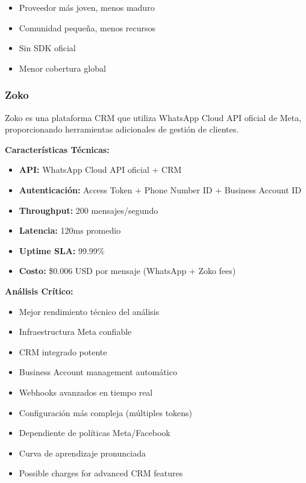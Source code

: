 \documentclass{article}
\begin{document}
\begin{itemize}[label=\textcolor{errorred}{$\times$}]
    \item Proveedor más joven, menos maduro
    \item Comunidad pequeña, menos recursos
    \item Sin SDK oficial
    \item Menor cobertura global
\end{itemize}

\subsubsection{Zoko}
\textnormal{Zoko es una plataforma CRM que utiliza WhatsApp Cloud API oficial de Meta, proporcionando herramientas adicionales de gestión de clientes.}

\textbf{Características Técnicas:}
\begin{itemize}
    \item \textbf{API:} WhatsApp Cloud API oficial + CRM
    \item \textbf{Autenticación:} Access Token + Phone Number ID + Business Account ID
    \item \textbf{Throughput:} 200 mensajes/segundo
    \item \textbf{Latencia:} 120ms promedio  
    \item \textbf{Uptime SLA:} 99.99\%
    \item \textbf{Costo:} \$0.006 USD por mensaje (WhatsApp + Zoko fees)
\end{itemize}

\textbf{Análisis Crítico:}
\begin{itemize}[label=\textcolor{successgreen}{$\checkmark$}]
    \item Mejor rendimiento técnico del análisis
    \item Infraestructura Meta confiable
    \item CRM integrado potente
    \item Business Account management automático
    \item Webhooks avanzados en tiempo real
\end{itemize}

\begin{itemize}[label=\textcolor{errorred}{$\times$}]
    \item Configuración más compleja (múltiples tokens)
    \item Dependiente de políticas Meta/Facebook
    \item Curva de aprendizaje pronunciada
    \item Possible charges for advanced CRM features
\end{itemize}
\end{document}
